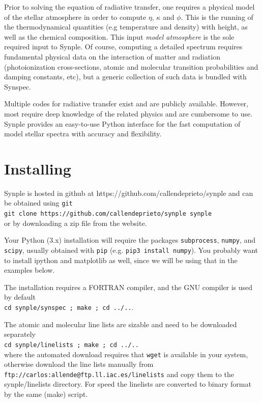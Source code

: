 \documentclass[]{article}
\begin{document}
Prior to solving the equation of radiative transfer, one requires a physical model of the stellar atmosphere in order to compute $\eta$, $\kappa$ and $\phi$. This is the running of the thermodynamical quantities (e.g temperature and density) with height, as well as the chemical composition. This input {\it model atmosphere} is the sole required input to Synple.  Of course, computing a detailed spectrum requires fundamental physical data on the interaction of matter and radiation (photoionization cross-sections, atomic and molecular transition probabilities and damping constants, etc), but a generic collection of such data is bundled with Synspec.

Multiple codes for radiative transfer exist and are publicly available. However, most require deep knowledge of the related physics and are cumbersome to use. Synple provides an easy-to-use Python interface for the fast computation of model stellar spectra with accuracy and flexibility.



\section{Installing}

Synple is hosted in github at https://github.com/callendeprieto/synple
and can be obtained using {\tt git} 
\\ {\tt git clone https://github.com/callendeprieto/synple synple} \\
\noindent or by downloading a zip file from the website.

Your Python (3.x) installation  will require the packages {\tt subprocess}, {\tt numpy}, and {\tt scipy}, usually obtained with {\tt pip} (e.g. {\tt pip3 install numpy}). You probably want to install ipython and matplotlib as well, since we will be using that in the examples below. 

The installation requires a FORTRAN compiler, and the GNU compiler is used by default
\\ {\tt cd synple/synspec ; make ; cd ../..}.

The atomic and molecular line lists are sizable and need to be downloaded separately
\\ {\tt cd synple/linelists ; make ; cd ../..} \\
\noindent where the automated download requires that {\tt wget} is available in your system, otherwise download the line lists manually from \\ {\tt ftp://carlos:allende@ftp.ll.iac.es/linelists} and copy them to the synple/linelists directory. For speed the linelists are converted to binary format by the same (make) script.
\end{document}
